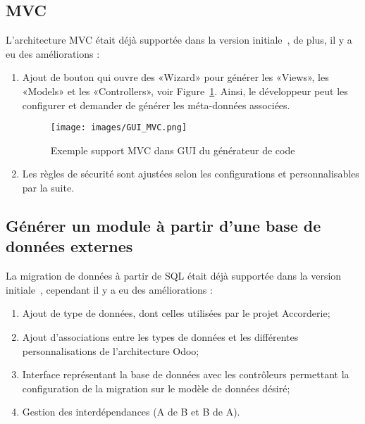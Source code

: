 \subsection{MVC}

L’architecture MVC était déjà supportée dans la version initiale~\cite{bluiksnot_repo}, de plus, il y a eu des améliorations : 

\begin{enumerate}
 \item Ajout de bouton qui ouvre des «Wizard» pour générer les «Views», les «Models» et les «Controllers», voir Figure~\ref{fig:dia_gui_mvc}. Ainsi, le développeur peut les configurer et demander de générer les méta-données associées.
    \begin{figure}[htb]
    \centering
    \texttt{[image: images/GUI\_MVC.png]}
    \caption{Exemple support MVC dans GUI du générateur de code}
    \label{fig:dia_gui_mvc}
    \end{figure}
 \item Les règles de sécurité sont ajustées selon les configurations et personnalisables par la suite.
\end{enumerate}

\subsection{Générer un module à partir d’une base de données externes}


La migration de données à partir de SQL était déjà supportée dans la version initiale~\cite{bluiksnot_repo}, cependant il y a eu des améliorations : 

\begin{enumerate}
    \item Ajout de type de données, dont celles utilisées par le projet Accorderie;
    \item Ajout d'associations entre les types de données et les différentes personnalisations de l’architecture Odoo;
    \item Interface représentant la base de données avec les contrôleurs permettant la configuration de la migration sur le modèle de données désiré;
    \item Gestion des interdépendances (A de B et B de A).
\end{enumerate}

